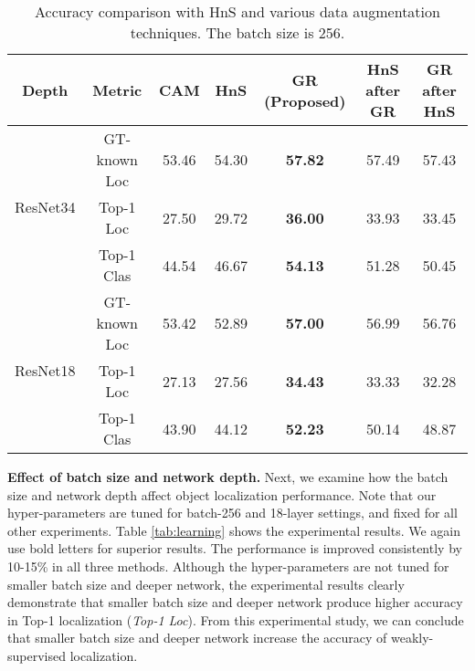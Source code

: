 \documentclass{bmvc2k}
\begin{document}
\begin{table*}[!t]
\centering
\label{tab:augmentation}
\begin{footnotesize}
\begin{tabular}{cc|ccccc}

\hline
Depth                     & Metric       & CAM \cite{zhou2016learning} & HnS \cite{singh2017hide} & GR (Proposed)          & HnS after GR & GR after HnS \\ \hline
\multirow{3}{*}{ResNet34} & GT-known Loc & 53.46    & 54.30    & \textbf{57.82} & 57.49        & 57.43        \\
                          & Top-1 Loc    & 27.50    & 29.72    & \textbf{36.00} & 33.93        & 33.45        \\
                          & Top-1 Clas   & 44.54    & 46.67    & \textbf{54.13} & 51.28        & 50.45        \\ \hline
\multirow{3}{*}{ResNet18} & GT-known Loc & 53.42    & 52.89    & \textbf{57.00} & 56.99        & 56.76        \\
                          & Top-1 Loc    & 27.13    & 27.56    & \textbf{34.43} & 33.33        & 32.28        \\
                          & Top-1 Clas   & 43.90    & 44.12    & \textbf{52.23} & 50.14        & 48.87        \\ \hline

\end{tabular}
\end{footnotesize}
\caption{Accuracy comparison with HnS and various data augmentation techniques. The batch size is 256.}
\end{table*}




\textbf{Effect of batch size and network depth.} Next, we examine how the batch size and network depth affect object localization performance. Note that our hyper-parameters are tuned for batch-256 and 18-layer settings, and fixed for all other experiments. Table \ref{tab:learning} shows the experimental results. We again use bold letters for superior results. The performance is improved consistently by 10-15\% in all three methods. Although the hyper-parameters are not tuned for smaller batch size and deeper network, the experimental results clearly demonstrate that smaller batch size and deeper network produce higher accuracy in Top-1 localization (\textit{Top-1 Loc}). From this experimental study, we can conclude that smaller batch size and deeper network increase the accuracy of weakly-supervised localization. 
\end{document}
